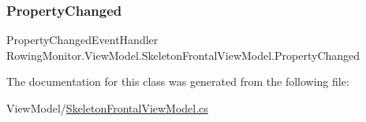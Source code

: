 \subsubsection{\texorpdfstring{Property\+Changed}{PropertyChanged}}
{\footnotesize\ttfamily Property\+Changed\+Event\+Handler Rowing\+Monitor.\+View\+Model.\+Skeleton\+Frontal\+View\+Model.\+Property\+Changed}



The documentation for this class was generated from the following file\+:\begin{DoxyCompactItemize}
\item 
View\+Model/\hyperlink{_skeleton_frontal_view_model_8cs}{Skeleton\+Frontal\+View\+Model.\+cs}\end{DoxyCompactItemize}
